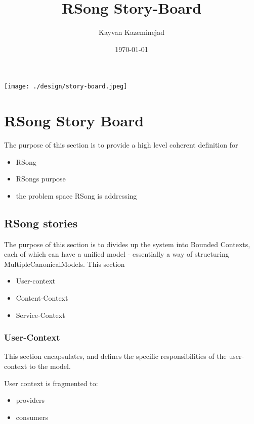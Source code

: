 \documentclass[11pt]{article}
\author{Kayvan Kazeminejad}
\date{\today}
\title{RSong Story-Board}
\begin{document}
\maketitle
\begin{center}
\texttt{[image: ./design/story-board.jpeg]}
\end{center}

\section*{RSong Story Board}
\label{sec:orgdc59b1e}
The purpose of this section is to provide a high level coherent definition for 
\begin{itemize}
\item RSong
\item RSongs purpose
\item the problem space RSong is addressing
\end{itemize}

\subsection*{RSong stories}
\label{sec:org59e6adf}
The purpose of this section is to divides up the system into Bounded Contexts, each of which can have a unified model - essentially a way of structuring MultipleCanonicalModels.
This section
\begin{itemize}
\item User-context
\item Content-Context
\item Service-Context
\end{itemize}

\subsubsection*{User-Context}
\label{sec:orgb047251}
This section encapsulates, and defines the specific responsibilities of the user-context to the model.

User context is fragmented to:
\begin{itemize}
\item providers
\item consumers
\end{itemize}
\end{document}
